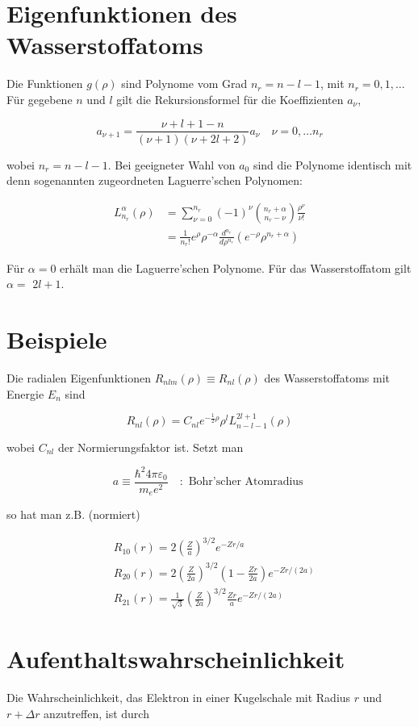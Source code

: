 \documentclass[10pt, letterpaper]{article}
\begin{document}
\section*{Eigenfunktionen des Wasserstoffatoms}
Die Funktionen $g(\rho)$ sind Polynome vom Grad $n_{r}=n-l-1$, mit $n_{r}=0,1, \ldots$ Für gegebene $n$ und $l$ gilt die Rekursionsformel für die Koeffizienten $a_{\nu}$,

$$
a_{\nu+1}=\frac{\nu+l+1-n}{(\nu+1)(\nu+2 l+2)} a_{\nu} \quad \nu=0, \ldots n_{r}
$$

wobei $n_{r}=n-l-1$. Bei geeigneter Wahl von $a_{0}$ sind die Polynome identisch mit denn sogenannten zugeordneten Laguerre'schen Polynomen:

$$
\begin{aligned}
L_{n_{r}}^{\alpha}(\rho) & =\sum_{\nu=0}^{n_{r}}(-1)^{\nu}\binom{n_{r}+\alpha}{n_{r}-\nu} \frac{\rho^{\nu}}{\nu!} \\
& =\frac{1}{n_{r}!} e^{\rho} \rho^{-\alpha} \frac{d^{n_{r}}}{d \rho^{n_{r}}}\left(e^{-\rho} \rho^{n_{r}+\alpha}\right)
\end{aligned}
$$

Für $\alpha=0$ erhält man die Laguerre'schen Polynome. Für das Wasserstoffatom gilt $\alpha=$ $2 l+1$.

\section*{Beispiele}
Die radialen Eigenfunktionen $R_{n l m}(\rho) \equiv R_{n l}(\rho)$ des Wasserstoffatoms mit Energie $E_{n}$ sind

$$
R_{n l}(\rho)=C_{n l} e^{-\frac{1}{2} \rho} \rho^{l} L_{n-l-1}^{2 l+1}(\rho)
$$

wobei $C_{n l}$ der Normierungsfaktor ist. Setzt man

$$
a \equiv \frac{\hbar^{2} 4 \pi \varepsilon_{0}}{m_{e} e^{2}} \quad: \text { Bohr'scher Atomradius }
$$

so hat man z.B. (normiert)

$$
\begin{aligned}
& R_{10}(r)=2\left(\frac{Z}{a}\right)^{3 / 2} e^{-Z r / a} \\
& R_{20}(r)=2\left(\frac{Z}{2 a}\right)^{3 / 2}\left(1-\frac{Z r}{2 a}\right) e^{-Z r /(2 a)} \\
& R_{21}(r)=\frac{1}{\sqrt{3}}\left(\frac{Z}{2 a}\right)^{3 / 2} \frac{Z r}{a} e^{-Z r /(2 a)}
\end{aligned}
$$

\section*{Aufenthaltswahrscheinlichkeit}
Die Wahrscheinlichkeit, das Elektron in einer Kugelschale mit Radius $r$ und $r+\Delta r$ anzutreffen, ist durch
\end{document}
